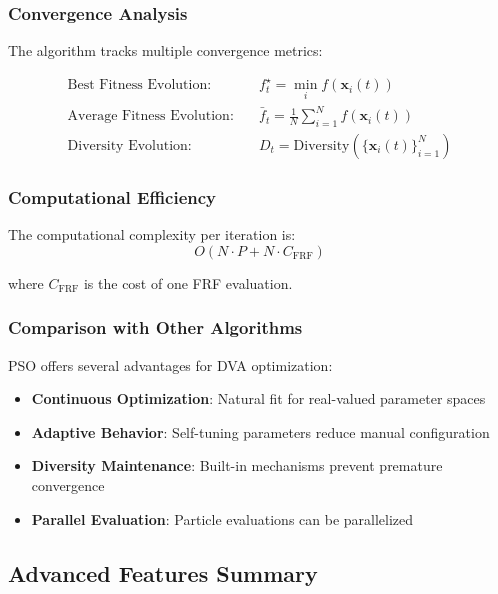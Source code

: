 \documentclass[12pt,a4paper]{article}
\begin{document}
\subsubsection{Convergence Analysis}

The algorithm tracks multiple convergence metrics:

\begin{align}
\text{Best Fitness Evolution:} \quad & f_t^{\star} = \min_{i} f(\mathbf{x}_i(t)) \label{eq:best_fitness_evolution} \\
\text{Average Fitness Evolution:} \quad & \bar{f}_t = \frac{1}{N} \sum_{i=1}^{N} f(\mathbf{x}_i(t)) \label{eq:avg_fitness_evolution} \\
\text{Diversity Evolution:} \quad & D_t = \text{Diversity}(\{\mathbf{x}_i(t)\}_{i=1}^{N}) \label{eq:diversity_evolution}
\end{align}

\subsubsection{Computational Efficiency}

The computational complexity per iteration is:
\begin{equation}
O(N \cdot P + N \cdot C_{\text{FRF}}) \label{eq:pso_complexity}
\end{equation}

where $C_{\text{FRF}}$ is the cost of one FRF evaluation.

\subsubsection{Comparison with Other Algorithms}

PSO offers several advantages for DVA optimization:

\begin{itemize}
    \item \textbf{Continuous Optimization}: Natural fit for real-valued parameter spaces
    \item \textbf{Adaptive Behavior}: Self-tuning parameters reduce manual configuration
    \item \textbf{Diversity Maintenance}: Built-in mechanisms prevent premature convergence
    \item \textbf{Parallel Evaluation}: Particle evaluations can be parallelized
\end{itemize}

\subsection{Advanced Features Summary}
\end{document}
